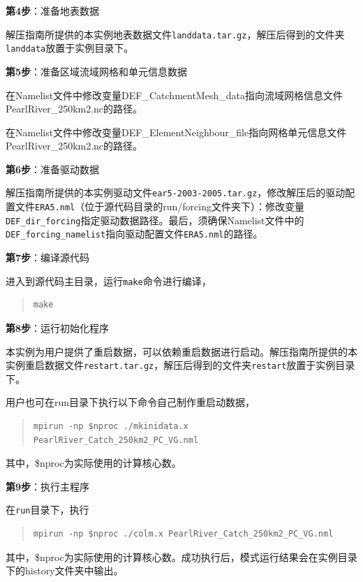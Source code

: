 \bigskip
\textbf{第4步}：准备地表数据

解压指南所提供的本实例地表数据文件\texttt{landdata.tar.gz}，解压后得到的文件夹\texttt{landdata}放置于实例目录下。

\bigskip
\textbf{第5步}：准备区域流域网格和单元信息数据

在Namelist文件中修改变量DEF\_CatchmentMesh\_data指向流域网格信息文件PearlRiver\_250km2.nc的路径。

在Namelist文件中修改变量DEF\_ElementNeighbour\_file指向网格单元信息文件PearlRiver\_250km2.nc的路径。

\bigskip
\textbf{第6步}：准备驱动数据

解压指南所提供的本实例驱动文件\texttt{ear5-2003-2005.tar.gz}，修改解压后的驱动配置文件\texttt{ERA5.nml}（位于源代码目录的run/forcing文件夹下）：修改变量\texttt{DEF\_dir\_forcing}指定驱动数据路径。最后，须确保Namelist文件中的\texttt{DEF\_forcing\_namelist}指向驱动配置文件\texttt{ERA5.nml}的路径。

\bigskip
\textbf{第7步}：编译源代码

进入到源代码主目录，运行\texttt{make}命令进行编译，
\begin{quote}
\begin{lstlisting}
make
\end{lstlisting}
\end{quote}

\bigskip
\textbf{第8步}：运行初始化程序

本实例为用户提供了重启数据，可以依赖重启数据进行启动。解压指南所提供的本实例重启数据文件\texttt{restart.tar.gz}，解压后得到的文件夹\texttt{restart}放置于实例目录下。

用户也可在run目录下执行以下命令自己制作重启动数据，
\begin{quote}
\begin{lstlisting}
mpirun -np $nproc ./mkinidata.x PearlRiver_Catch_250km2_PC_VG.nml
\end{lstlisting}
\end{quote}
其中，\$nproc为实际使用的计算核心数。

\bigskip
\textbf{第9步}：执行主程序

在\texttt{run}目录下，执行
\begin{quote}
\begin{lstlisting}
mpirun -np $nproc ./colm.x PearlRiver_Catch_250km2_PC_VG.nml
\end{lstlisting}
\end{quote}
其中，\$nproc为实际使用的计算核心数。成功执行后，模式运行结果会在实例目录下的history文件夹中输出。

